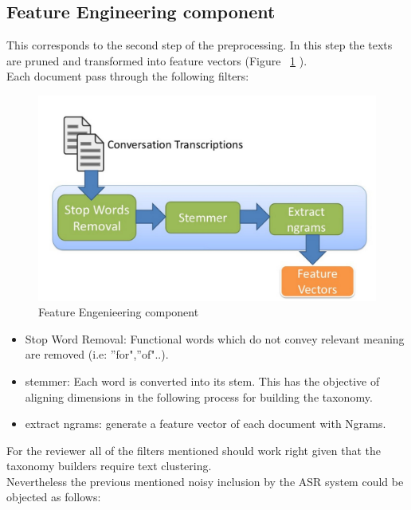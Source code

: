 \documentclass[4pt,a4paper,twocolumn]{article}
\begin{document}
\subsection{Feature Engineering component}

This corresponds to the second step of the preprocessing. In this step the texts are pruned and transformed into feature vectors (Figure ~\ref{fig:eng_component} ).\\
Each document pass through the following filters:

\begin{figure}[]
  \centering
    \includegraphics[scale=0.2]{pics/eng_component.jpg}
    \caption{Feature Engenieering component}
   \label{fig:eng_component}  
\end{figure}

\begin{itemize}
	\item Stop Word Removal: Functional words which do not convey relevant meaning are removed (i.e: ''for",''of"..).
	
	\item stemmer: Each word is converted into its stem. This has the objective of aligning dimensions in the following process for building the taxonomy.
	
	\item extract ngrams:  generate a feature vector of each document with Ngrams.
\end{itemize}

For the reviewer all of the filters mentioned should work right given that the taxonomy builders require text clustering.\\
Nevertheless the previous mentioned noisy inclusion by the ASR system could be objected as follows:
\end{document}

